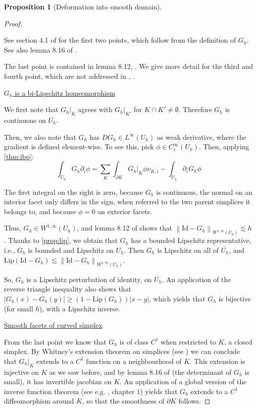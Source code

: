 \documentclass[english,a4paper,9pt,oneside]{scrbook}	%
\theoremstyle{break}
\newtheorem{prop}[equation]{Proposition}
\newenvironment{mproof}[1][\proofname]{%
  \begin{proof}[#1]$ $\par\nobreak\ignorespaces
}{%
  \end{proof}
}
\renewcommand*{\proofname}{Proof}
\theoremstyle{remark}
\newcommand{\norm}[1]{\left\lVert#1\right\rVert}
\newcommand{\id}{\text{Id}}
\begin{document}
\begin{appendices}
\begin{prop}[Deformation into smooth domain]
\end{prop}
\begin{mproof}

See section 4.1 of \cite{elliott} for the first two points, which follow from the definition of $G_h$. See also lemma 8.16 of \cite{ranner}.

The last point is contained in lemma 8.12, \cite{ranner}. We give more detail for the third and fourth point, which are not addressed in \cite{ranner}, \cite{elliott}.

\underline{$G_h$ is a bi-Lipschitz homeomorphism}

We first note that $G_h|_K$ agrees with $G_h|_{K'}$ for $K\cap K' \neq \emptyset$. Therefore $G_h$ is continuous on $\overline{U_h}$.

Then, we also note that $G_h$ has $DG_h \in L^\infty(U_h)$ as weak derivative, where the gradient is defined element-wise. To see this, pick $\phi \in C^\infty_c(U_h)$.
Then, applying \cref{thm:ibp}:
$$\int_{U_h} G_h \partial_i \phi = \sum_K \int_{\partial K}G_h|_{K} \phi \nu_{K,i}  - \int_{U_h}\partial_i G_h \phi$$

The first integral on the right is zero, because $G_h$ is continuous, the normal on an interior facet only differs in the sign, when referred to the two parent simplices it belongs to, and because $\phi=0$ on exterior facets.

Thus, $G_h \in W^{1,\infty}(U_h)$, and lemma 8.12 of \cite{ranner} shows that $\norm{\id -G_h}_{W^{1,\infty}(U_h)}\lesssim h$. Thanks to \cref{prop:lip}, we obtain that $G_h$ has a bounded Lipschitz representative, i.e., $G_h$ is bounded and Lipschitz on $U_h$. Then $G_h$ is Lipschitz on all of $\overline{U_h}$, and $\text{Lip}(\id -G_h) \lesssim  \norm{\id -G_h}_{W^{1,\infty}(U_h)}$.

So, $G_h$ is a Lipschitz perturbation of identity, on $\overline{U_h}$.  An application of the reverse triangle inequality also shows that $|G_h(x)-G_h(y)|\geq (1-\text{Lip}(G_h))|x-y|$, which yields that $G_h$ is bijective (for small $h$), with a Lipschitz inverse.



\underline{Smooth facets of curved simplex}

From the last point we know that $G_h$ is of class $C^1$ when restricted to $K$, a closed simplex. By Whitney's extension theorem on simplices (see \cite{whitney}) we can conclude that $G_h|_K$ extends to a $C^1$ function on a neighbourhood of $K$. This extension is injective on $K$ as we saw before, and by lemma 8.16 of \cite{ranner} (the determinant of $G_h$ is small), it has invertible jacobian on $K$. An application of a global version of the inverse function theorem (see e.g. \cite{pollack}, chapter 1) yields that $G_h$ extends to a $C^1$ diffeomorphism around $K$, so that the smoothness of $\partial K$ follows.
\end{mproof}


\end{appendices}
\end{document}
